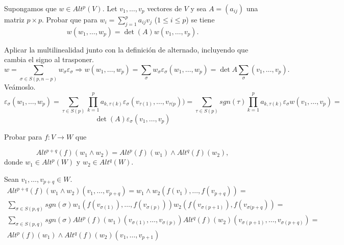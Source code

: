 \documentclass[twoside]{article}
\begin{document}
\newpage

\begin{ejercicio}{2.6}
Supongamos que $w\in Alt^p(V)$. Let $v_1,\dots, v_p$ vectores de $V$ y sea $A=(a_{ij})$ una matriz $p\times p$. Probar que para $w_i=\sum_{j=1}^pa_{ij}v_j$ ($1\leq i\leq p$) se tiene
$$w(w_1,\dots, w_p)=\det(A)w(v_1,\dots, v_p).$$
\end{ejercicio}
\begin{solucion}
Aplicar la multilinealidad junto con la definición de alternado, incluyendo que cambia el signo al trasponer.
\[
w=\sum_{\sigma\in S(p,n-p)} w_{\sigma}\varepsilon_{\sigma}\Rightarrow w(w_1,\dots, w_p)=\sum_{\sigma}w_{\sigma}\varepsilon_{\sigma}(w_1,\dots, w_p)=\det A\sum_{\sigma}(v_1,\dots, v_p). 
\]
Veámoslo.
\[
\varepsilon_{\sigma}(w_1,\dots, w_p)=\sum_{\tau\in S(p)}\prod_{k=1}^p a_{k,\tau(k)} \varepsilon_{\sigma}(v_{\tau(1)},\dots, v_{\tau(p}))=\sum_{\tau\in S(p)}sgn(\tau)\prod_{k=1}^p a_{k,\tau(k)} \varepsilon_{\sigma} w(v_{1},\dots, v_{p})=
\]
\[
\det(A)\varepsilon_{\sigma}(v_1,\dots, v_p)
\]
\end{solucion}

\newpage

\begin{ejercicio}{2.7}
Probar para $f:V\to W$ que

$$Alt^{p+q}(f)(w_1\land w_2)=Alt^p(f)(w_1)\land Alt^q(f)(w_2),$$
donde $w_1\in Alt^p(W)$ y $w_2\in Alt^q(W)$.
\end{ejercicio}
\begin{solucion}
Sean $v_1,\dots, v_{p+q}\in W$. 
\begin{gather*}
Alt^{p+q}(f)(w_1\land w_2)(v_1,\dots, v_{p+q})=w_1\land w_2(f(v_1),\dots, f(v_{p+q}))=\\
\sum_{\sigma\in S(p,q)}sgn(\sigma)w_1(f(v_{\sigma(1)}),\dots, f(v_{\sigma(p)}))w_2(f(v_{\sigma(p+1)}),f(v_{\sigma(p+q}))=\\
\sum_{\sigma\in S(p,q)}sgn(\sigma) Alt^p(f)(w_1)(v_{\sigma(1)},\dots, v_{\sigma(p)})Alt^q(f)(w_2)(v_{\sigma(p+1)},\dots, v_{\sigma(p+q)})=\\
Alt^p(f)(w_1)\land Alt^q(f)(w_2)(v_1,\dots, v_{p+1})
\end{gather*}
\end{solucion}

\newpage
\end{document}
